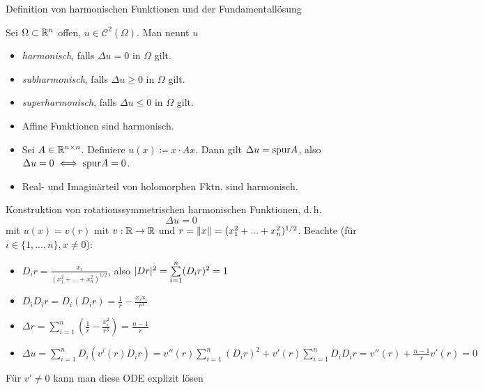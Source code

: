 \documentclass{cheat-sheet}
\begin{document}
  Definition von harmonischen Funktionen und der Fundamentallösung
\fi

\begin{defn}
  Sei $\Omega \subset \mathbb{R}^n$ offen, $u \in \mathcal{C}^2(\Omega)$. Man nennt $u$
  \begin{itemize}
    \item \emph{harmonisch}, falls $\Delta u = 0$ in $\Omega$ gilt.
    \item \emph{subharmonisch}, falls $\Delta u \geq 0$ in $\Omega$ gilt.
    \item \emph{superharmonisch}, falls $\Delta u \leq 0$ in $\Omega$ gilt.
  \end{itemize}
\end{defn}

\begin{bspe}
  \begin{itemize}
    \item Affine Funktionen sind harmonisch.
    \item Sei $A \in \mathbb{R}^{n \times n}$. Definiere $u(x) \coloneqq x \cdot Ax$. Dann gilt $\Delta u = \mathrm{spur} A$, also $\Delta u = 0 \iff \mathrm{spur} A = 0$.
    \item Real- und Imaginärteil von holomorphen Fktn. sind harmonisch.
  \end{itemize}
\end{bspe}

\iffalse
  Konstruktion von rotationssymmetrischen harmonischen Funktionen, d.\,h.
  \[ \Delta u = 0 \]
  mit $u(x) = v(r)$ mit $v : \mathbb{R} \to \mathbb{R}$ und $r = \lVert x\rVert = (x_1^2 + ... + x_n^2)^{1/2}$.
  Beachte (für $i \in \{ 1, ..., n \}, x \not= 0$):
  \begin{itemize}
    \item $D_i r = \frac{x_i}{(x_1^2 + ... + x_n^2)^{1/2}}$, also $\abs{Dr}^2 = \sum_{i=1}^n (D_i r)^2 = 1$
    \item $D_i D_i r = D_i (D_i r) = \frac{1}{r} - \frac{x_i x_i}{r^3}$
    \item $\Delta r = \sum_{i=1}^n (\frac{1}{r} - \frac{x_i^2}{r^3}) = \frac{n-1}{r}$
    \item $\Delta u = \sum_{i=1}^n D_i (v^i(r) D_i r) = v''(r) \sum_{i=1}^n (D_i r)^2 + v'(r) \sum_{i=1}^n D_i D_i r = v''(r) + \frac{n-1}{r} v'(r) = 0$
  \end{itemize}

  Für $v' \not= 0$ kann man diese ODE explizit lösen
\end{document}
